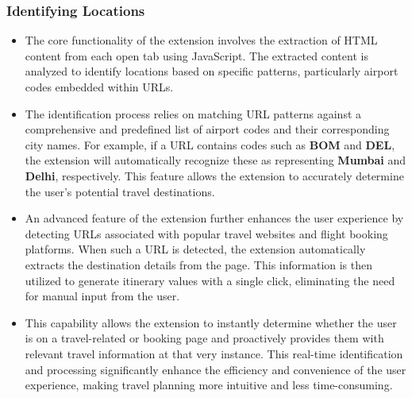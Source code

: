 \documentclass[conference]{IEEEtran}
\begin{document}
    \subsubsection{Identifying Locations}
        \begin{itemize}
            \item The core functionality of the extension involves the extraction of HTML content from each open tab using JavaScript. The extracted content is analyzed to identify locations based on specific patterns, particularly airport codes embedded within URLs.
            \item The identification process relies on matching URL patterns against a comprehensive and predefined list of airport codes and their corresponding city names. For example, if a URL contains codes such as \textbf{BOM} and \textbf{DEL}, the extension will automatically recognize these as representing \textbf{Mumbai} and \textbf{Delhi}, respectively. This feature allows the extension to accurately determine the user’s potential travel destinations.
            \item An advanced feature of the extension further enhances the user experience by detecting URLs associated with popular travel websites and flight booking platforms. When such a URL is detected, the extension automatically extracts the destination details from the page. This information is then utilized to generate itinerary values with a single click, eliminating the need for manual input from the user.
            \item This capability allows the extension to instantly determine whether the user is on a travel-related or booking page and proactively provides them with relevant travel information at that very instance. This real-time identification and processing significantly enhance the efficiency and convenience of the user experience, making travel planning more intuitive and less time-consuming.
        \end{itemize}
\end{document}
